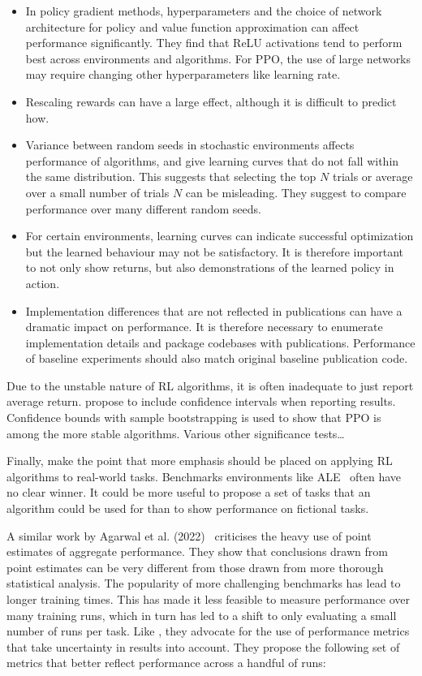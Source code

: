 \begin{itemize}
    \item In policy gradient methods, hyperparameters and the choice of network architecture for policy and value function approximation can affect performance significantly.
    They find that ReLU activations tend to perform best across environments and algorithms.
    For PPO, the use of large networks may require changing other hyperparameters like learning rate.
    \item Rescaling rewards can have a large effect, although it is difficult to predict how.
    \item Variance between random seeds in stochastic environments affects performance of algorithms, and give learning curves that do not fall within the same distribution.
    This suggests that selecting the top \(N\) trials or average over a small number of trials \(N\) can be misleading. They suggest to compare performance over many different random seeds.
    \item For certain environments, learning curves can indicate successful optimization but the learned behaviour may not be satisfactory.
    It is therefore important to not only show returns, but also demonstrations of the learned policy in action.
    \item Implementation differences that are not reflected in publications can have a dramatic impact on performance.
    It is therefore necessary to enumerate implementation details and package codebases with publications.
    Performance of baseline experiments should also match original baseline publication code.
\end{itemize}

Due to the unstable nature of RL algorithms, it is often inadequate to just report average return.
\cite{henderson_matters_2018} propose to include confidence intervals when reporting results.
Confidence bounds with sample bootstrapping is used to show that PPO is among the more stable algorithms.
Various other significance tests\dots

Finally, \cite{henderson_matters_2018} make the point that more emphasis should be placed on applying RL algorithms to real-world tasks.
Benchmarks environments like ALE~\cite{arcade} often have no clear winner.
It could be more useful to propose a set of tasks that an algorithm could be used for than to show performance on fictional tasks.

A similar work by Agarwal et al. (2022)~\cite{agarwal_rlliable_2022} criticises the heavy use of point estimates of aggregate performance.
They show that conclusions drawn from point estimates can be very different from those drawn from more thorough statistical analysis. 
The popularity of more challenging benchmarks has lead to longer training times.
This has made it less feasible to measure performance over many training runs,
which in turn has led to a shift to only evaluating a small number of runs per task.
Like \cite{henderson_matters_2018}, they advocate for the use  of performance metrics that take uncertainty in results into account.
They propose the following set of metrics that better reflect performance across a handful of runs:

